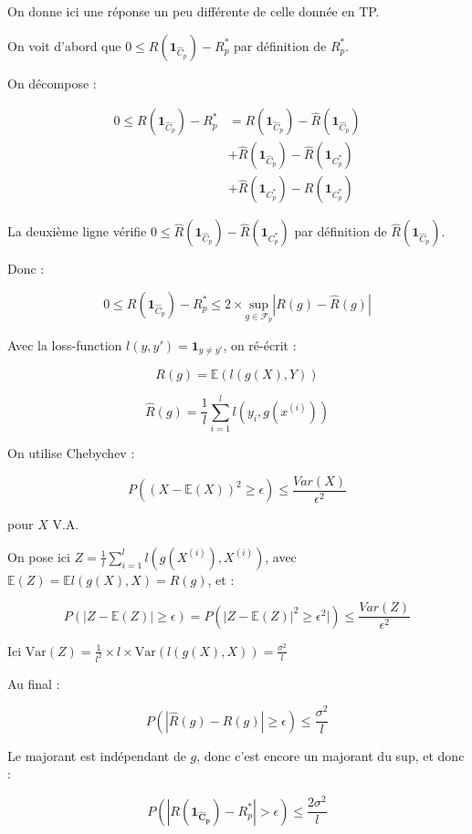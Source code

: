 \documentclass[french]{article}
\begin{document}
On donne ici une réponse un peu différente de celle donnée en TP.

On voit d'abord que $0 \leq R(\mathbf{1}_{\hat{C}_{p}}) - R^{*}_{p}$ par définition de $ R^{*}_{p} $.

On décompose :

\begin{align}
0 \leq R(\mathbf{1}_{\hat{C}_{p}}) - R^{*}_{p} &= R(\mathbf{1}_{\hat{C}_{p}}) - \hat{R}(\mathbf{1}_{\hat{C}_{p}}) \\
&+ \hat{R}(\mathbf{1}_{\hat{C}_{p}}) - \hat{R}(\mathbf{1}_{C_{p}^{*}}) \\
&+ \hat{R}(\mathbf{1}_{C_{p}^{*}}) - R(\mathbf{1}_{C_{p}^{*}})
\end{align}

La deuxième ligne vérifie $0 \leq \hat{R}(\mathbf{1}_{\hat{C}_{p}}) - \hat{R}(\mathbf{1}_{C_{p}^{*}}) $ par définition de $\hat{R}(\mathbf{1}_{\hat{C}_{p}})$.

Donc :

\[
0 \leq R(\mathbf{1}_{\hat{C}_{p}}) - R^{*}_{p} \leq 2 \times
\underset{g \in \mathcal{F}_{p}}{\mathrm{sup}} 
|R(g) - \hat{R}(g) |
\]

Avec la loss-function $l(y,y') = \mathbf{1}_{y \neq y'}$, on ré-écrit :

\[
R(g) = \mathbb{E}(l(g(X),Y))
\]

\[
\hat{R}(g) = \frac{1}{l}\sum_{i=1}^{l}l(y_{i},g(x^{(i)}))
\]

On utilise Chebychev :

\[
P((X-\mathbb{E}(X))^{2} \geq \epsilon) \leq \frac{Var(X)}{\epsilon^{2}}
\]

pour $X$ V.A.

On pose ici $Z = \frac{1}{l}\sum_{i=1}^{l} l(g(X^{(i)}),X^{(i)})$, avec $ \mathbb{E}(Z) = \mathbb{E}l(g(X),X) = R(g) $, et :

\[
P(|Z-\mathbb{E}(Z)|\geq \epsilon) = P(|Z-\mathbb{E}(Z)|^{2}\geq \epsilon^{2}|) \leq \frac{Var(Z)}{\epsilon^{2}}
\]

Ici $\mathrm{Var}(Z) = \frac{1}{l^{2}} \times l \times \mathrm{Var}(l(g(X),X)) = \frac{\sigma^{2}}{l}$

Au final : 

\[
P(|\hat{R}(g) - R(g)|\geq \epsilon) \leq \frac{\sigma^{2}}{l}
\]

Le majorant est indépendant de $g$, donc c'est encore un majorant du sup, et donc :

\[
P(|R(\mathbf{1_{\hat{C}_{p}}})-R_{p}^{*}|>\epsilon) \leq \frac{2\sigma^{2}}{l}
\]
\end{document}
